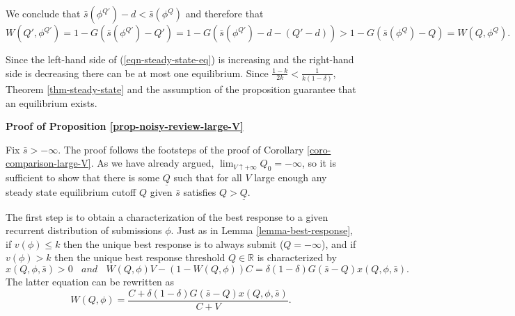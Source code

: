 \documentclass[12pt]{article}
\theoremstyle{plain}
\theoremstyle{definition}
\theoremstyle{remark}
\def\RR{\mathbb{R}}
\begin{document}
    We conclude that $\bar s(\phi^{Q'})-d < \bar s(\phi^{Q})$ and therefore that
    $$W(Q',\phi^{Q'})=1-G(\bar s(\phi^{Q'})-Q') = 1-G(\bar s(\phi^{Q'})-d-(Q'-d)) > 1-G(\bar s(\phi^{Q})-Q) = W(Q,\phi^Q).$$

    Since the left-hand side of (\ref{eqn-steady-state-eq}) is increasing and the right-hand side is decreasing there can be at most one equilibrium. Since $\frac{1-k}{2k}< \frac{1}{k(1-\delta)}$, Theorem \ref{thm-steady-state} and the assumption of the proposition guarantee that an equilibrium exists.


\bigskip

\noindent \textbf{Proof of Proposition \ref{prop-noisy-review-large-V}}

    Fix $\bar s>-\infty$. The proof follows the footsteps of the proof of Corollary \ref{coro-comparison-large-V}. As we have already argued, $\lim_{V\uparrow +\infty} Q_0=-\infty$, so it is sufficient to show that there is some $\underline{Q}$ such that for all $V$ large enough any steady state equilibrium cutoff $Q$ given $\bar s$ satisfies $Q>\underline{Q}$.

    The first step is to obtain a characterization of the best response to a given recurrent distribution of submissions $\phi$. Just as in Lemma \ref{lemma-best-response}, if $v(\phi)\le k$ then the unique best response is to always submit ($Q=-\infty$), and if $v(\phi)> k$ then the unique best response threshold $Q\in \RR$ is characterized by 
    $$x(Q,\phi,\bar s) > 0 ~~~~\textit{and}~~~~ W(Q,\phi)V - (1-W(Q,\phi))C = \delta(1-\delta)G(\bar s-Q)x(Q,\phi,\bar s).$$
    The latter equation can be rewritten as 
    \begin{equation}\label{eqn-best-response-noisy-review}
    W(Q,\phi) = \frac{C+\delta(1-\delta)G(\bar s-Q)x(Q,\phi,\bar s)}{C+V}.
    \end{equation}
\end{document}
